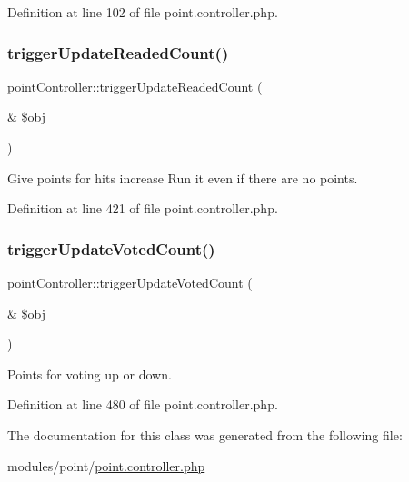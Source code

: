 Definition at line 102 of file point.\+controller.\+php.

\mbox{\label{classpointController_a6f9b3f42509f0d9555197d525f114377}} 
\subsubsection{\texorpdfstring{trigger\+Update\+Readed\+Count()}{triggerUpdateReadedCount()}}
{\footnotesize\ttfamily point\+Controller\+::trigger\+Update\+Readed\+Count (\begin{DoxyParamCaption}\item[{\&}]{\$obj }\end{DoxyParamCaption})}



Give points for hits increase Run it even if there are no points. 



Definition at line 421 of file point.\+controller.\+php.

\mbox{\label{classpointController_a78d6e1a06de73d2443338c322d136ab5}} 
\subsubsection{\texorpdfstring{trigger\+Update\+Voted\+Count()}{triggerUpdateVotedCount()}}
{\footnotesize\ttfamily point\+Controller\+::trigger\+Update\+Voted\+Count (\begin{DoxyParamCaption}\item[{\&}]{\$obj }\end{DoxyParamCaption})}



Points for voting up or down. 



Definition at line 480 of file point.\+controller.\+php.



The documentation for this class was generated from the following file\+:\begin{DoxyCompactItemize}
\item 
modules/point/\hyperlink{point_8controller_8php}{point.\+controller.\+php}\end{DoxyCompactItemize}
